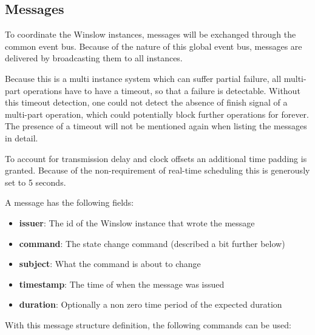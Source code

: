 \subsection{Messages}

To coordinate the Winslow instances, messages will be exchanged through the common event bus.
Because of the nature of this global event bus, messages are delivered by broadcasting them to all instances.

Because this is a multi instance system which can suffer partial failure, all multi-part operations have to have a timeout, so that a failure is detectable.
Without this timeout detection, one could not detect the absence of finish signal of a multi-part operation, which could potentially block further operations for forever.
The presence of a timeout will not be mentioned again when listing the messages in detail.

To account for transmission delay and clock offsets an additional time padding is granted.
Because of the non-requirement of real-time scheduling this is generously set to 5 seconds.

A message has the following fields:

\begin{itemize}
	\item \textbf{issuer}: The id of the Winslow instance that wrote the message
	\item \textbf{command}: The state change command (described a bit further below)
	\item \textbf{subject}: What the command is about to change
	\item \textbf{timestamp}: The time of when the message was issued
	\item \textbf{duration}: Optionally a non zero time period of the expected duration
\end{itemize}

With this message structure definition, the following commands can be used:

